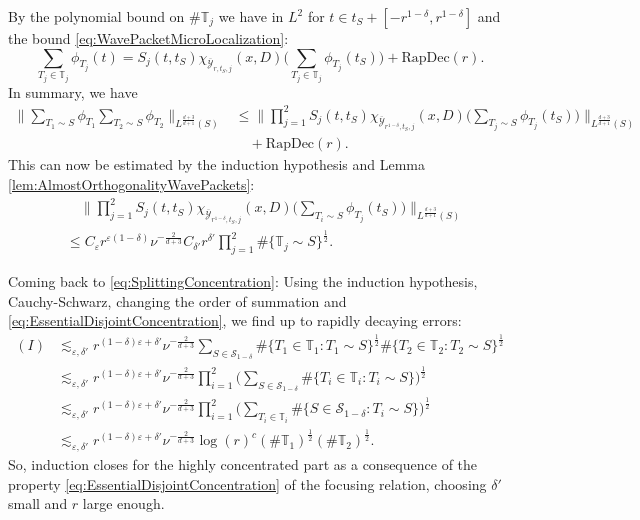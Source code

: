 \documentclass{amsart}
\theoremstyle{definition}
\newcommand{\T}{\mathbb{T}}
\begin{document}
By the polynomial bound on $\# \T_j$ we have in $L^2$ for $t \in t_S + [-r^{1-\delta},r^{1-\delta}]$ and the bound \eqref{eq:WavePacketMicroLocalization}:
\begin{equation*}
\sum_{T_j \in \T_j} \phi_{T_j}(t) = S_j(t,t_S) \chi_{\overline{\mathcal{Y}}_{r,t_S,j}}(x,D) \big( \sum_{T_j \in \T_j} \phi_{T_j}(t_S) \big) + \text{RapDec}(r).
\end{equation*}
In summary, we have
\begin{equation*}
\begin{split}
\big\| \sum_{T_1 \sim S} \phi_{T_1} \sum_{T_2 \sim S} \phi_{T_2} \big\|_{L^{\frac{d+3}{d+1}}(S)} &\leq \big\| \prod_{j=1}^2 S_j(t,t_S) \chi_{\overline{\mathcal{Y}}_{r^{1-\delta},t_S,j}}(x,D) \big( \sum_{T_j \sim S} \phi_{T_j}(t_S) \big) \big\|_{L^{\frac{d+3}{d+1}}(S)}  \\ &\quad + \text{RapDec}(r).
\end{split}
\end{equation*}
This can now be estimated by the induction hypothesis and Lemma \ref{lem:AlmostOrthogonalityWavePackets}:
\begin{equation*}
\begin{split}
&\quad \big\| \prod_{j=1}^2 S_j(t,t_S) \chi_{\overline{\mathcal{Y}}_{r^{1-\delta},t_S,j}}(x,D) \big( \sum_{T_i \sim S} \phi_{T_j}(t_S) \big) \big\|_{L^{\frac{d+3}{d+1}}(S)} \\
 &\leq C_\varepsilon r^{\varepsilon(1-\delta)} \nu^{-\frac{2}{d+3}} C_{\delta'} r^{\delta'} \prod_{j=1}^2 \# \{ \T_j \sim S \}^{\frac{1}{2}}.
\end{split}
\end{equation*}


\smallskip

Coming back to \eqref{eq:SplittingConcentration}: Using the induction hypothesis, Cauchy-Schwarz, changing the order of summation and \eqref{eq:EssentialDisjointConcentration}, we find up to rapidly decaying errors:
\begin{equation*}
\begin{split}
(I) &\lesssim_{\varepsilon,\delta'} r^{(1-\delta)\varepsilon+\delta'}  \nu^{-\frac{2}{d+3}} \sum_{S \in \mathcal{S}_{1-\delta}} \# \{ T_1 \in \T_1 : T_1 \sim S \}^{\frac{1}{2}} \# \{ T_2 \in \T_2 : T_2 \sim S \}^{\frac{1}{2}} \\
&\lesssim_{\varepsilon,\delta'} r^{(1-\delta)\varepsilon+\delta'} \nu^{-\frac{2}{d+3}} \prod_{i=1}^2 \big( \sum_{S \in \mathcal{S}_{1-\delta}} \# \{ T_i \in \T_i : T_i \sim S \} \big)^{\frac{1}{2}} \\
&\lesssim_{\varepsilon,\delta'} r^{(1-\delta)\varepsilon+\delta'} \nu^{-\frac{2}{d+3}} \prod_{i=1}^2 \big( \sum_{T_i \in \T_i} \# \{ S \in \mathcal{S}_{1-\delta} : T_i \sim S \} \big)^{\frac{1}{2}} \\
&\lesssim_{\varepsilon,\delta'} r^{(1-\delta) \varepsilon+\delta'} \nu^{-\frac{2}{d+3}} \log(r)^c (\# \T_1)^{\frac{1}{2}} (\# \T_2)^{\frac{1}{2}}.
\end{split}
\end{equation*}
So, induction closes for the highly concentrated part as a consequence of the property \eqref{eq:EssentialDisjointConcentration} of the focusing relation, choosing $\delta'$ small and $r$ large enough.
\end{document}
